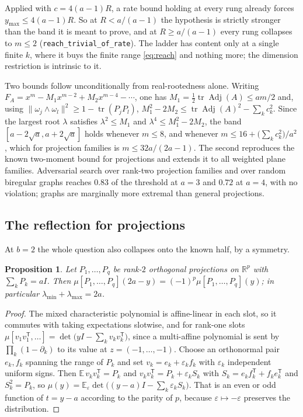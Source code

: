 \documentclass[11pt]{article}
\newtheorem{proposition}[theorem]{Proposition}
\theoremstyle{remark}
\begin{document}
Applied with $c=4(a-1)R$, a rate bound holding at every rung already forces
$y_{\max}\le4(a-1)R$. So at $R<a/(a-1)$ the hypothesis is strictly stronger than the band it is
meant to prove, and at $R\ge a/(a-1)$ every rung collapses to $m\le2$
(\texttt{reach\_trivial\_of\_rate}). The ladder has content only at a single finite $k$, where it
buys the finite range \eqref{eq:reach} and nothing more; the dimension restriction is intrinsic
to it.

Two bounds follow unconditionally from real-rootedness alone. Writing
$F_A=x^m-M_1x^{m-2}+M_2x^{m-4}-\cdots$, one has $M_1=\tfrac12\operatorname{tr}
\operatorname{Adj}(A)\le am/2$ and, using $\|\omega_j\wedge\omega_l\|^2\ge
1-\operatorname{tr}(P_jP_l)$, $M_1^2-2M_2\le\operatorname{tr}
\operatorname{Adj}(A)^2-\sum_kc_k^2$. Since the largest root $\lambda$ satisfies
$\lambda^2\le M_1$ and $\lambda^4\le M_1^2-2M_2$, the band
$[a-2\sqrt a,a+2\sqrt a]$ holds whenever $m\le8$, and whenever
$m\le16+\bigl(\sum_kc_k^2\bigr)/a^2$, which for projection families is
$m\le32a/(2a-1)$. The second reproduces the known two-moment bound for projections
and extends it to all weighted plane families. Adversarial search over rank-two projection families and
over random biregular graphs reaches $0.83$ of the threshold at $a=3$ and $0.72$ at
$a=4$, with no violation; graphs are marginally more extremal than general
projections.

\subsection{The reflection for projections}

At $b=2$ the whole question also collapses onto the known half, by a symmetry.

\begin{proposition}\label{prop:reflect}
Let $P_1,\dots,P_q$ be rank-$2$ orthogonal projections on $\mathbb R^p$ with
$\sum_kP_k=aI$. Then $\mu[P_1,\dots,P_q](2a-y)=(-1)^p\mu[P_1,\dots,P_q](y)$; in
particular $\lambda_{\min}+\lambda_{\max}=2a$.
\end{proposition}

\begin{proof}
The mixed characteristic polynomial is affine-linear in each slot, so it commutes
with taking expectations slotwise, and for rank-one slots
$\mu[v_1v_1^{\mathsf T},\dots]=\det\bigl(yI-\sum_kv_kv_k^{\mathsf T}\bigr)$, since a
multi-affine polynomial is sent by $\prod_k(1-\partial_k)$ to its value at
$z=(-1,\dots,-1)$. Choose an orthonormal pair $e_k,f_k$ spanning the range of $P_k$
and set $v_k=e_k+\varepsilon_kf_k$ with $\varepsilon_k$ independent uniform signs.
Then $\mathbb E\,v_kv_k^{\mathsf T}=P_k$ and
$v_kv_k^{\mathsf T}=P_k+\varepsilon_kS_k$ with
$S_k=e_kf_k^{\mathsf T}+f_ke_k^{\mathsf T}$ and $S_k^2=P_k$, so
$\mu(y)=\mathbb E_\varepsilon\det\bigl((y-a)I-\sum_k\varepsilon_kS_k\bigr)$. That is
an even or odd function of $t=y-a$ according to the parity of $p$, because
$\varepsilon\mapsto-\varepsilon$ preserves the distribution.
\end{proof}
\end{document}
